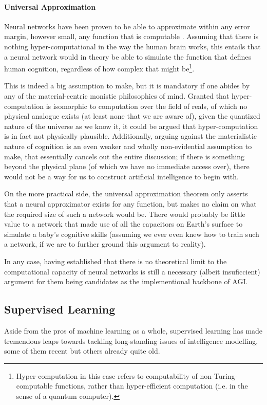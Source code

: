 \documentclass[]{article}
\begin{document}
\paragraph{Universal Approximation}
Neural networks have been proven to be able to approximate within any error margin, however small, any function that is computable \cite{Cybenko1989} . Assuming that there is nothing hyper-computational in the way the human brain works, this entails that a neural network would in theory be able to simulate the function that defines human cognition, regardless of how complex that might be\footnote{Hyper-computation in this case refers to computability of non-Turing-computable functions, rather than hyper-efficient computation (i.e. in the sense of a quantum computer).}. 

This is indeed a big assumption to make, but it is mandatory if one abides by any of the material-centric monistic philosophies of mind. Granted that hyper-computation is isomorphic to computation over the field of reals, of which no physical analogue exists (at least none that we are aware of), given the quantized nature of the universe as we know it, it could be argued that hyper-computation is in fact not physically plausible. Additionally, arguing against the materialistic nature of cognition is an even weaker and wholly non-evidential assumption to make, that essentially cancels out the entire discussion; if there is something beyond the physical plane (of which we have no immediate access over), there would not be a way for us to construct artificial intelligence to begin with.

On the more practical side, the universal approximation theorem only asserts that a neural approximator exists for any function, but makes no claim on what the required size of such a network would be. There would probably be little value to a network that made use of all the capacitors on Earth's surface to simulate a baby's cognitive skills (assuming we ever even knew how to train such a network, if we are to further ground this argument to reality). 

In any case, having established that there is no theoretical limit to the computational capacity of neural networks is still a necessary (albeit insuficcient) argument for them being candidates as the implementional backbone of AGI.

\subsection{Supervised Learning}
Aside from the pros of machine learning as a whole, supervised learning has made tremendous leaps towards tackling long-standing issues of intelligence modelling, some of them recent but others already quite old.
\end{document}
